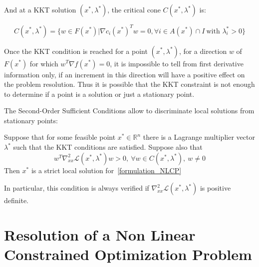And at a KKT solution $(x^*,\lambda^*)$, the critical cone $C(x^*, \lambda^*)$ is:

\begin{equation}
  C(x^*,\lambda^*) = \{w\in F(x^*)|{\nabla c_i(x^*)}^T w=0, \forall i\in\mathit{A}(x^*)\cap I\ \text{with } \lambda_i^*>0\}
\end{equation}


Once the KKT condition is reached for a point $(x^*, \lambda^*)$, for a direction $w$ of $F(x^*)$ for which $w^T\nabla f(x^*)=0$, it is impossible to tell from first derivative information only, if an increment in this direction will have a positive effect on the problem resolution.
Thus it is possible that the KKT constraint is not enough to determine if a point is a solution or just a stationary point.

The Second-Order Sufficient Conditions allow to discriminate local solutions from stationary points:

\begin{theorem}
  Suppose that for some feasible point $x^*\in \mathbb{R}^n$ there is a Lagrange multiplier vector $\lambda^*$ such that the KKT conditions are satisfied. Suppose also that
  \begin{equation}
    w^T\nabla_{xx}^2\mathcal{L}(x^*,\lambda^*)w>0,\ \forall w\in C(x^*,\lambda^*),\ w\neq 0
  \end{equation}
  Then $x^*$ is a strict local solution for~\ref{formulation_NLCP}
\end{theorem}

In particular, this condition is always verified if $\nabla_{xx}^2\mathcal{L}(x^*,\lambda^*)$ is positive definite.

\section{Resolution of a Non Linear Constrained Optimization Problem}
\label{sec:resolution_of_a_non_linear_constrained_optimization_problem}

